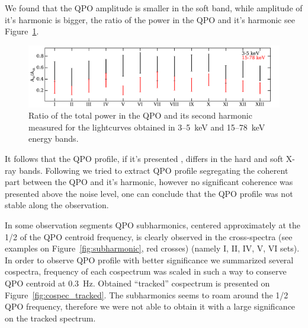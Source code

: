 \documentclass[a4paper,fleqn,usenatbib]{mnras}
\begin{document}
We found that the QPO amplitude is smaller in the soft band, while amplitude of it's harmonic is bigger, the ratio of the power in the QPO and it's harmonic see Figure~\ref{fig:qpo_ratio}.
\begin{figure}
\includegraphics[width=\columnwidth]{QPO_and_harmonic_ratio_ylabel.pdf}
        \caption{Ratio of the total power in the QPO and its second harmonic measured for the lightcurves obtained in 3--5~keV and 15--78~keV energy bands.}
        \label{fig:qpo_ratio}
\end{figure}
It follows that the QPO profile, if it's presented \citep[see, e.g.][]{2015MNRAS.446.3516I}, differs in the hard and soft X-ray bands.
Following \citep{2015MNRAS.446.3516I} we tried to extract  QPO profile segregating the coherent part between the QPO and it's harmonic, however no significant coherence was presented above the noise level, one can conclude that the QPO profile was not stable along the observation. 

In some observation segments QPO subharmonics, centered approximately at the 1/2 of the QPO centroid frequency, is clearly observed in the cross-spectra (see examples on Figure~\ref{fig:subharmonic}, red crosses) (namely I, II, IV, V, VI sets).
In order to observe QPO profile with better significance we summarized several cospectra, frequency of each cospectrum was scaled in such a way to conserve QPO centroid at 0.3~Hz.
Obtained ``tracked'' cospectrum is presented on Figure~\ref{fig:cospec_tracked}.
The subharmonics seems to roam around the 1/2 QPO frequency, therefore we were not able to obtain it with a large significance on the tracked spectrum.
\end{document}
